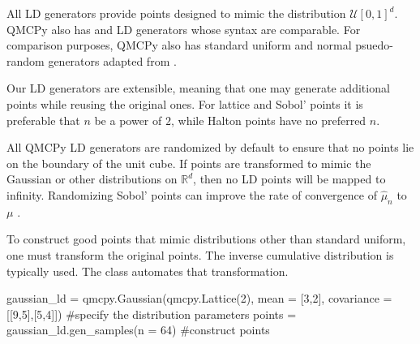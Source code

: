 \documentclass[11pt]{NSFamsart}
\newcommand{\reals}{{\mathbb{R}}}
\newcommand{\calu}{{\mathcal{U}}}
\newcommand{\hmu}{\hat{\mu}}
\begin{document}
All LD generators provide points designed to mimic the distribution $\calu[0,1]^d$.  QMCPy also has  \cite{DicPil10a} and  \cite{Hal60} LD generators whose syntax are comparable.  
For comparison purposes, QMCPy also has standard uniform and normal psuedo-random generators adapted from .  
 
Our LD generators are extensible, meaning that one may generate additional points while reusing the original ones.  For lattice and Sobol' points it is preferable that $n$ be a power of $2$, while Halton points have no preferred $n$.
 

All QMCPy LD generators are randomized by default to ensure that no points lie on the boundary of the unit cube.  If points are transformed to mimic the Gaussian or other distributions on $\reals^d$, then no LD points will be mapped to infinity.  Randomizing Sobol' points can improve the rate of convergence of $\hmu_n$ to $\mu$ \cite{Owe97}.

To construct good points that mimic distributions other than standard uniform, one must transform the original points.  The  inverse cumulative distribution is typically used.  The  class automates that transformation.
\begin{pythoncode}
gaussian_ld = qmcpy.Gaussian(qmcpy.Lattice(2), mean = [3,2], covariance = [[9,5],[5,4]])  #specify the distribution parameters 
points = gaussian_ld.gen_samples(n = 64)  #construct points
\end{pythoncode}
\end{document}
